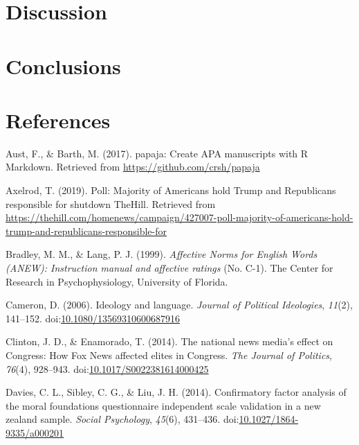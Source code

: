 \documentclass[english,,man]{apa6}
\begin{document}
\hypertarget{discussion-1}{%
\section{Discussion}\label{discussion-1}}

\hypertarget{conclusions}{%
\section{Conclusions}\label{conclusions}}

\newpage

\hypertarget{references}{%
\section{References}\label{references}}

\begingroup
\setlength{\parindent}{-0.5in}
\setlength{\leftskip}{0.5in}

\hypertarget{refs}{}
\leavevmode\hypertarget{ref-Aust2017}{}%
Aust, F., \& Barth, M. (2017). papaja: Create APA manuscripts with R Markdown. Retrieved from \url{https://github.com/crsh/papaja}

\leavevmode\hypertarget{ref-Axelrod2019}{}%
Axelrod, T. (2019). Poll: Majority of Americans hold Trump and Republicans responsible for shutdown \textbar{} TheHill. Retrieved from \url{https://thehill.com/homenews/campaign/427007-poll-majority-of-americans-hold-trump-and-republicans-responsible-for}

\leavevmode\hypertarget{ref-Bradley1999}{}%
Bradley, M. M., \& Lang, P. J. (1999). \emph{Affective Norms for English Words (ANEW): Instruction manual and affective ratings} (No. C-1). The Center for Research in Psychophysiology, University of Florida.

\leavevmode\hypertarget{ref-Cameron2006}{}%
Cameron, D. (2006). Ideology and language. \emph{Journal of Political Ideologies}, \emph{11}(2), 141--152. doi:\href{https://doi.org/10.1080/13569310600687916}{10.1080/13569310600687916}

\leavevmode\hypertarget{ref-Clinton2014}{}%
Clinton, J. D., \& Enamorado, T. (2014). The national news media's effect on Congress: How Fox News affected elites in Congress. \emph{The Journal of Politics}, \emph{76}(4), 928--943. doi:\href{https://doi.org/10.1017/S0022381614000425}{10.1017/S0022381614000425}

\leavevmode\hypertarget{ref-Davies2014}{}%
Davies, C. L., Sibley, C. G., \& Liu, J. H. (2014). Confirmatory factor analysis of the moral foundations questionnaire independent scale validation in a new zealand sample. \emph{Social Psychology}, \emph{45}(6), 431--436. doi:\href{https://doi.org/10.1027/1864-9335/a000201}{10.1027/1864-9335/a000201}
\end{document}
